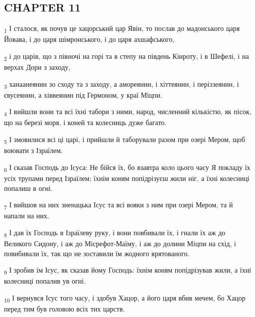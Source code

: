 \subsection{CHAPTER 11}
\begin{tcolorbox}
\textsubscript{1} І сталося, як почув це хацорський цар Явін, то послав до мадонського царя Йовава, і до царя шімронського, і до царя ахшафського,
\end{tcolorbox}
\begin{tcolorbox}
\textsubscript{2} і до царів, що з півночі на горі та в степу на південь Кінроту, і в Шефелі, і на верхах Дори з заходу,
\end{tcolorbox}
\begin{tcolorbox}
\textsubscript{3} ханаанеянин зо сходу та з заходу, а амореянин, і хіттеянин, і періззеянин, і євусеянин, а хіввеянин під Гермоном, у краї Міцпи.
\end{tcolorbox}
\begin{tcolorbox}
\textsubscript{4} І вийшли вони та всі їхні табори з ними, народ, численний кількістю, як пісок, що на березі моря, і коней та колесниць дуже багато.
\end{tcolorbox}
\begin{tcolorbox}
\textsubscript{5} І змовилися всі ці царі, і прийшли й таборували разом при озері Мером, щоб воювати з Ізраїлем.
\end{tcolorbox}
\begin{tcolorbox}
\textsubscript{6} І сказав Господь до Ісуса: Не бійся їх, бо взавтра коло цього часу Я покладу їх усіх трупами перед Ізраїлем; їхнім коням попідрізуєш жили ніг, а їхні колесниці попалиш в огні.
\end{tcolorbox}
\begin{tcolorbox}
\textsubscript{7} І вийшов на них зненацька Ісус та всі вояки з ним при озері Мером, та й напали на них.
\end{tcolorbox}
\begin{tcolorbox}
\textsubscript{8} І дав їх Господь в Ізраїлеву руку, і вони повбивали їх, і гнали їх аж до Великого Сидону, і аж до Місрефот-Маїму, і аж до долини Міцпи на схід, і повибивали їх, так що не зоставили їм жодного врятованого.
\end{tcolorbox}
\begin{tcolorbox}
\textsubscript{9} І зробив їм Ісус, як сказав йому Господь: їхнім коням попідрізував жили, а їхні колесниці попалив ув огні.
\end{tcolorbox}
\begin{tcolorbox}
\textsubscript{10} І вернувся Ісус того часу, і здобув Хацор, а його царя вбив мечем, бо Хацор перед тим був головою всіх тих царств.
\end{tcolorbox}
